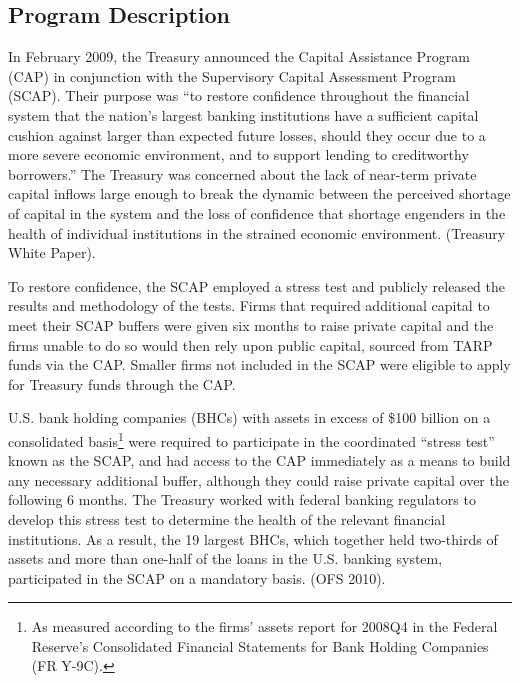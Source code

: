 \documentclass[justified, nobib]{tufte-handout2}
\begin{document}

\subsection{Program Description}

In February 2009, the Treasury announced the Capital Assistance Program
(CAP) in conjunction with the Supervisory Capital Assessment Program
(SCAP). Their purpose was ``to restore confidence throughout the
financial system that the nation's largest banking institutions have a
sufficient capital cushion against larger than expected future losses,
should they occur due to a more severe economic environment, and to
support lending to creditworthy borrowers.'' The Treasury was concerned
about the lack of near-term private capital inflows large enough to
break the dynamic between the perceived shortage of capital in the
system and the loss of confidence that shortage engenders in the health
of individual institutions in the strained economic environment.
(Treasury White Paper).

To restore confidence, the SCAP employed a stress test and publicly
released the results and methodology of the tests. Firms that required
additional capital to meet their SCAP buffers were given six months to
raise private capital and the firms unable to do so would then rely upon
public capital, sourced from TARP funds via the CAP. Smaller firms not
included in the SCAP were eligible to apply for Treasury funds through
the CAP.

U.S. bank holding companies (BHCs) with assets in excess of \$100
billion on a consolidated basis\footnote{As measured according to the
  firms' assets report for 2008Q4 in the Federal Reserve's Consolidated
  Financial Statements for Bank Holding Companies (FR Y-9C).} were
required to participate in the coordinated ``stress test'' known as the
SCAP, and had access to the CAP immediately as a means to build any
necessary additional buffer, although they could raise private capital
over the following 6 months. The Treasury worked with federal banking
regulators to develop this stress test to determine the health of the
relevant financial institutions. As a result, the 19 largest BHCs, which
together held two-thirds of assets and more than one-half of the loans
in the U.S. banking system, participated in the SCAP on a mandatory
basis. (OFS 2010).
\end{document}
